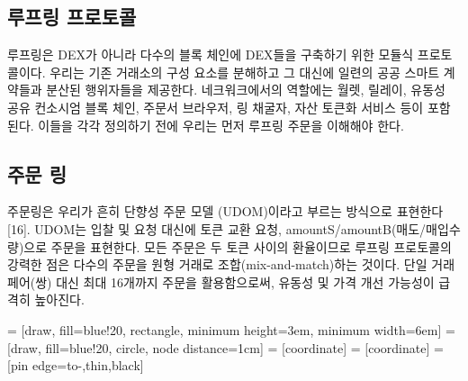 \documentclass{article}
\makeatletter
\newenvironment{figurehere}
{\def\@captype{figure}}
{}
\makeatother
\begin{document}
\begin{multicols}{2}
\section{루프링 프로토콜\label{sec:loopring_protocol}}
루프링은 DEX가 아니라 다수의 블록 체인에 DEX들을 구축하기 위한 모듈식 프로토콜이다. 우리는 기존 거래소의 구성 요소를 분해하고 그 대신에 일련의 공공 스마트 계약들과 분산된 행위자들을 제공한다. 
네크워크에서의 역할에는 월렛, 릴레이, 유동성 공유 컨소시엄 블록 체인, 주문서 브라우저, 링 채굴자, 자산 토큰화 서비스 등이 포함된다. 이들을 각각 정의하기 전에 우리는 먼저 루프링 주문을 이해해야 한다.

\subsection{주문 링\label{sec:order_ring}}
주문링은 우리가 흔히 단향성 주문 모델 (UDOM)이라고 부르는 방식으로 표현한다[16]. UDOM는 입찰 및 요청 대신에 토큰 교환 요청, amountS/amountB(매도/매입수량)으로 주문을 표현한다. 모든 주문은 두 토큰 사이의 환율이므로 루프링 프로토콜의 강력한 점은 다수의 주문을 원형 거래로 조합(mix-and-match)하는 것이다. 단일 거래 페어(쌍) 대신 최대 16개까지 주문을 활용함으로써, 유동성 및 가격 개선 가능성이 급격히 높아진다. 

\begin{center}
	\begin{figurehere}
		\centering
		 = [draw, fill=blue!20, rectangle, 
		minimum height=3em, minimum width=6em]
		 = [draw, fill=blue!20, circle, node distance=1cm]
		 = [coordinate]
		 = [coordinate]
		 = [pin edge={to-,thin,black}]
		
\end{figurehere}
\end{center}
\end{multicols}
\end{document}
